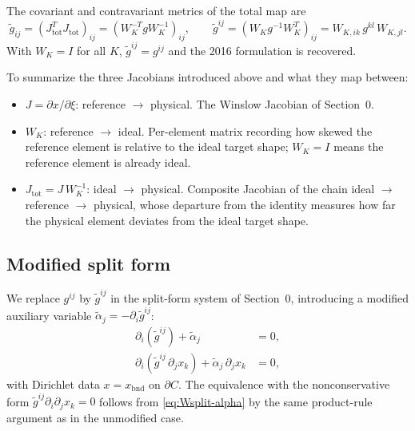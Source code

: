 \documentclass[11pt]{article}
\begin{document}
The covariant and contravariant metrics of the total map are
\begin{equation}
  \tilde g_{ij} = (J_{\mathrm{tot}}^T J_{\mathrm{tot}})_{ij}
                = (W_K^{-T} g W_K^{-1})_{ij},
  \qquad
  \tilde g^{ij} = (W_K g^{-1} W_K^T)_{ij}
                = W_{K,ik}\, g^{kl}\, W_{K,jl}.
  \label{eq:tildeg}
\end{equation}
With $W_K = I$ for all $K$, $\tilde g^{ij} = g^{ij}$ and the 2016
formulation is recovered.

To summarize the three Jacobians introduced above and what they map
between:
\begin{itemize}
  \item $J = \partial x/\partial \xi$: reference $\to$ physical. The
    Winslow Jacobian of Section~0.
  \item $W_K$: reference $\to$ ideal. Per-element matrix recording how
    skewed the reference element is relative to the ideal target shape;
    $W_K = I$ means the reference element is already ideal.
  \item $J_{\mathrm{tot}} = J\, W_K^{-1}$: ideal $\to$ physical. Composite
    Jacobian of the chain ideal $\to$ reference $\to$ physical, whose
    departure from the identity measures how far the physical element
    deviates from the ideal target shape.
\end{itemize}

\subsection{Modified split form}

We replace $g^{ij}$ by $\tilde g^{ij}$ in the split-form system of
Section~0, introducing a modified auxiliary variable
$\tilde\alpha_j = -\partial_i \tilde g^{ij}$:
\begin{align}
  \partial_i(\tilde g^{ij}) + \tilde\alpha_j &= 0, \label{eq:Wsplit-alpha}\\
  \partial_i(\tilde g^{ij}\, \partial_j x_k)
    + \tilde\alpha_j\, \partial_j x_k &= 0,
    \label{eq:Wsplit-x}
\end{align}
with Dirichlet data $x = x_{\mathrm{bnd}}$ on $\partial C$. The
equivalence with the nonconservative form
$\tilde g^{ij}\partial_i\partial_j x_k = 0$ follows from
\eqref{eq:Wsplit-alpha} by the same product-rule argument as in the
unmodified case.
\end{document}
